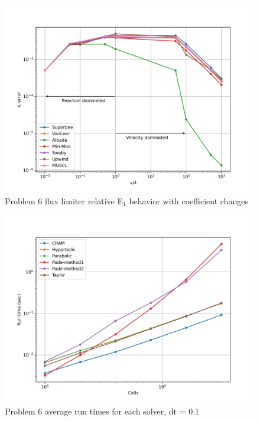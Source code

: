 \clearpage

\begin{figure}[p]
    \centering
    \includegraphics[width=6in]{images/chapter-5/progressionProblems/problem6/problem6CoefficientChanges.png}
    \caption{Problem 6 flux limiter relative E${}_{1}$ behavior with coefficient changes}
    \label{fig:problem6_l1error_coefficient_changes}
\end{figure}

\clearpage

\begin{figure}[p]
    \centering
    \includegraphics[width=6in]{images/chapter-5/progressionProblems/problem6/problem6Runtimes.png}
    \caption{Problem 6 average run times for each solver, dt = 0.1}
    \label{fig:problem6_runtimes}
\end{figure}

